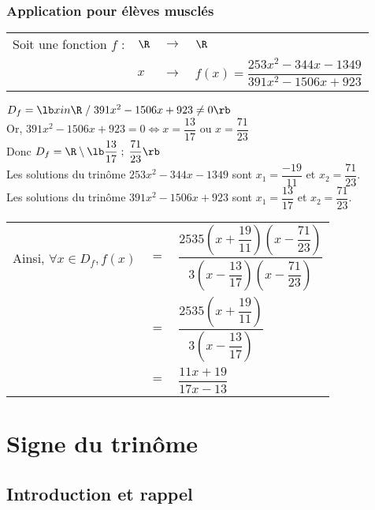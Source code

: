 \subsubsection{Application pour élèves musclés}

\begin{tabular}{llll}
Soit une fonction $f$ : & $\R$ & $\longrightarrow$ & $\R$ \\
& $x$ & $\longrightarrow$ & $f\left(x\right) = \dfrac{253x^2 - 344x - 1349}{391x^2 - 1506x + 923}$\\ 
\end{tabular}

$D_f = \lb x\\in \R \; / \; 391x^2 - 1506x + 923 \neq 0 \rb $ \\

Or, $391x^2 - 1506x + 923 = 0 \Longleftrightarrow x = \dfrac{13}{17}$ ou $ x = \dfrac{71}{23}$ \\

Donc $D_f = \R \setminus \lb \dfrac{13}{17} \; ; \; \dfrac{71}{23} \rb $ \\

Les solutions du trinôme $253x^2 - 344x - 1349$ sont $x_1 = \dfrac{-19}{11}$ et $x_2 = \dfrac{71}{23}$. \\

Les solutions du trinôme $391x^2 - 1506x + 923$ sont $x_1 = \dfrac{13}{17}$ et $x_2 = \dfrac{71}{23}$.

\begin{tabular}{lll}
Ainsi, $\forall x \in D_f, f\left(x\right)$ & $=$ &$ \dfrac{2535\left(x + \dfrac{19}{11}\right)\left(x-\dfrac{71}{23}\right)}{3\left(x-\dfrac{13}{17}\right)\left(x-\dfrac{71}{23}\right)}$ \\
& $=$ &$ \dfrac{2535\left(x + \dfrac{19}{11}\right)}{3\left(x-\dfrac{13}{17}\right)}$ \\
& $=$ & $\dfrac{11x + 19}{17x - 13}$ \\
\end{tabular}

\vspace*{-5cm}

\newpage

\section{Signe du trinôme}

\subsection{Introduction et rappel}

